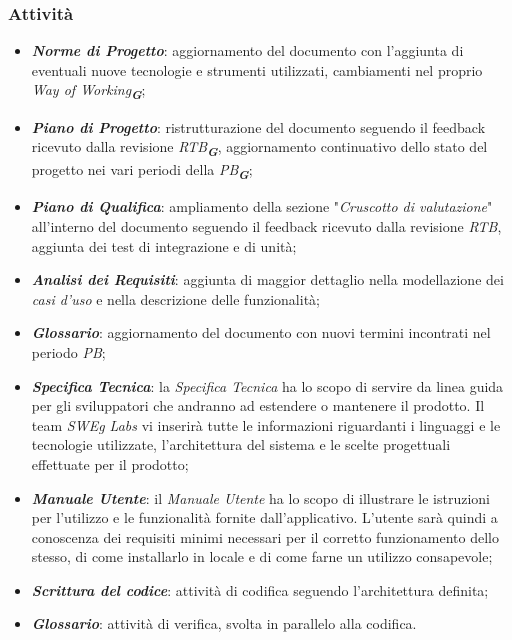 \subsubsection{Attività}

\begin{itemize}
\item \textbf{\emph{Norme di Progetto}}: aggiornamento del documento con l’aggiunta di eventuali nuove tecnologie e strumenti utilizzati, cambiamenti nel proprio {\emph{Way of Working}}\textsubscript{\textit{\textbf{G}}};
\item \textbf{\emph{Piano di Progetto}}: ristrutturazione del documento seguendo il feedback ricevuto dalla revisione {\emph{RTB}}\textsubscript{\textit{\textbf{G}}}, aggiornamento continuativo dello stato del progetto nei vari periodi della {\emph{PB}}\textsubscript{\textit{\textbf{G}}};
\item \textbf{\emph{Piano di Qualifica}}: ampliamento della sezione "\emph{Cruscotto di valutazione}" all’interno del documento seguendo il feedback ricevuto dalla revisione \emph{RTB}, aggiunta dei test di integrazione e di unità;
\item \textbf{\emph{Analisi dei Requisiti}}: aggiunta di maggior dettaglio nella modellazione dei \emph{casi d’uso} e nella descrizione delle funzionalità;
\item \textbf{\emph{Glossario}}: aggiornamento del documento con nuovi termini incontrati nel periodo \emph{PB};
\item \textbf{\emph{Specifica Tecnica}}: la \emph{Specifica Tecnica} ha lo scopo di servire da linea guida per gli sviluppatori che andranno ad estendere o mantenere il prodotto. Il team \emph{SWEg Labs} vi inserirà tutte le informazioni riguardanti i linguaggi e le tecnologie utilizzate, l’architettura del sistema e le scelte progettuali effettuate per il prodotto;
\item \textbf{\emph{Manuale Utente}}: il \emph{Manuale Utente} ha lo scopo di illustrare le istruzioni per l’utilizzo e le funzionalità fornite dall’applicativo. L’utente sarà quindi a conoscenza dei requisiti minimi necessari per il corretto funzionamento dello stesso, di come installarlo in locale e di come farne un utilizzo consapevole;
\item \textbf{\emph{Scrittura del codice}}: attività di codifica seguendo l’architettura definita;
\item \textbf{\emph{Glossario}}: attività di verifica, svolta in parallelo alla codifica.
\end{itemize}


